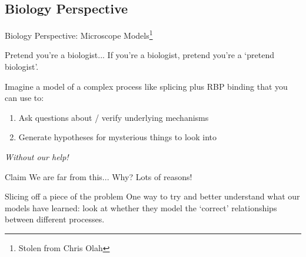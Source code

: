 \documentclass[pdf]{beamer} %
\begin{document}
\subsection{Biology Perspective}
\begin{frame}[t]{Biology Perspective: Microscope Models\footnote{Stolen from Chris Olah}}
   \begin{block}{Pretend you're a biologist...}
      If you're a biologist, pretend you're a `pretend biologist'. 
   \end{block} 

   Imagine a model of a complex process like splicing plus RBP binding that you can use to:
   \begin{enumerate}
       \item Ask questions about / verify underlying mechanisms
       \item Generate hypotheses for mysterious things to look into
   \end{enumerate}
   \textit{Without our help!}

   \begin{block}{Claim} We are far from this... Why? Lots of reasons! \end{block}
\end{frame}

\begin{frame}[t]{Slicing off a piece of the problem}
    One way to try and better understand what our models have learned: look at whether they model the `correct' relationships between different processes.
\end{frame}
\end{document}
